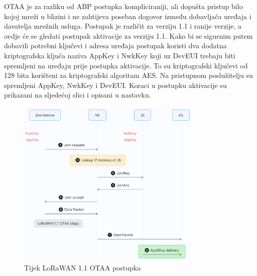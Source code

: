 \documentclass[times, utf8, diplomski]{fer}
\begin{document}
OTAA je za razliku od ABP postupka kompliciraniji, ali dopušta pristup bilo kojoj mreži u blizini i ne zahtijeva poseban dogovor između dobavljača uređaja i davatelja mrežnih usluga. Postupak je različit za verziju 1.1 i ranije verzije, a ovdje će se gledati postupak aktivacije za verziju 1.1. Kako bi se sigurnim putem dobavili potrebni ključevi i adresa uređaja postupak koristi dva dodatna kriptografska ključa naziva AppKey i NwkKey koji uz DevEUI trebaju biti spremljeni na uređaju prije postupka aktivacije. To su kriptografski ključevi od 128 bita korišteni za kriptografski algoritam AES. Na pristupnom poslužitelju su spremljeni AppKey, NwkKey i DevEUI. Koraci u postupku aktivacije su prikazani na sljedećoj slici i opisani u nastavku.
\begin{figure}[H]
    \centering
    \includegraphics[width=8.8cm]{images/otaa.png}
    \caption{Tijek LoRaWAN 1.1 OTAA postupka\citep{LoRaWAN}}
    \label{fig:otaa}
\end{figure}
\end{document}

